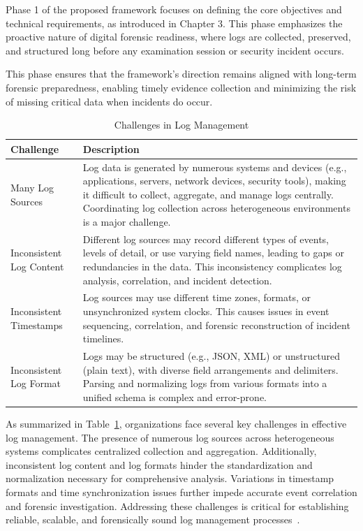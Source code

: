 Phase 1 of the proposed framework focuses on defining the core objectives and technical requirements, as introduced in Chapter 3. This phase emphasizes the proactive nature of digital forensic readiness, where logs are collected, preserved, and structured long before any examination session or security incident occurs.


This phase ensures that the framework's direction remains aligned with long-term forensic preparedness, enabling timely evidence collection and minimizing the risk of missing critical data when incidents do occur.

\begin{table}[h!]
	\centering
	\caption{Challenges in Log Management}
	\begin{tabular}{|p{5cm}|p{9cm}|}
		\hline
		\textbf{Challenge} & \textbf{Description} \\
		\hline
		Many Log Sources & Log data is generated by numerous systems and devices (e.g., applications, servers, network devices, security tools), making it difficult to collect, aggregate, and manage logs centrally. Coordinating log collection across heterogeneous environments is a major challenge. \\
		\hline
		Inconsistent Log Content & Different log sources may record different types of events, levels of detail, or use varying field names, leading to gaps or redundancies in the data. This inconsistency complicates log analysis, correlation, and incident detection. \\
		\hline
		Inconsistent Timestamps & Log sources may use different time zones, formats, or unsynchronized system clocks. This causes issues in event sequencing, correlation, and forensic reconstruction of incident timelines. \\
		\hline
		Inconsistent Log Format & Logs may be structured (e.g., JSON, XML) or unstructured (plain text), with diverse field arrangements and delimiters. Parsing and normalizing logs from various formats into a unified schema is complex and error-prone. \\
		\hline
	\end{tabular}
	\label{tab:log_management_challenges}
\end{table}
As summarized in Table~\ref{tab:log_management_challenges}, organizations face several key challenges in effective log management. The presence of numerous log sources across heterogeneous systems complicates centralized collection and aggregation. Additionally, inconsistent log content and log formats hinder the standardization and normalization necessary for comprehensive analysis. Variations in timestamp formats and time synchronization issues further impede accurate event correlation and forensic investigation. Addressing these challenges is critical for establishing reliable, scalable, and forensically sound log management processes~\citet{kentnist800922006guide}.


